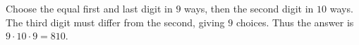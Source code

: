 Choose the equal first and last digit in $9$ ways, then the second digit in $10$ ways. The third digit must differ from the second, giving $9$ choices. Thus the answer is $9\cdot10\cdot9=\boxed{810}$.
